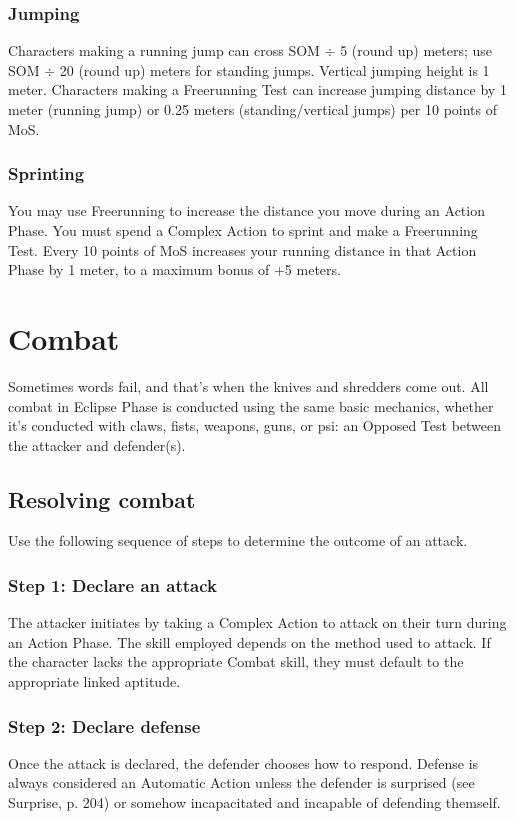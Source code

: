 \subsubsection{Jumping} Characters making a running jump can cross SOM $\div$ 5 (round up) meters; use SOM $\div$ 20 (round up) meters for standing jumps. Vertical jumping height is 1 meter. Characters making a Freerunning Test can increase jumping distance by 1 meter (running jump) or 0.25 meters (standing/vertical jumps) per 10 points of MoS.

\subsubsection{Sprinting} You may use Freerunning to increase the distance you move during an Action Phase. You must spend a Complex Action to sprint and make a Freerunning Test. Every 10 points of MoS increases your running distance in that Action Phase by 1 meter, to a maximum bonus of +5 meters.


\section{Combat}
\label{sec:combat}

Sometimes words fail, and that’s when the knives and shredders come out. All combat in Eclipse Phase is conducted using the same basic mechanics, whether it’s conducted with claws, fists, weapons, guns, or psi: an Opposed Test between the attacker and defender(s).

\subsection{Resolving combat}

Use the following sequence of steps to determine the outcome of an attack.

\subsubsection{Step 1: Declare an attack} The attacker initiates by taking a Complex Action to attack on their turn during an Action Phase. The skill employed depends on the method used to attack. If the character lacks the appropriate Combat skill, they must default to the appropriate linked aptitude.

\subsubsection{Step 2: Declare defense} Once the attack is declared, the defender chooses how to respond. Defense is always considered an Automatic Action unless the defender is surprised (see Surprise, p. 204) or somehow incapacitated and incapable of defending themself.

